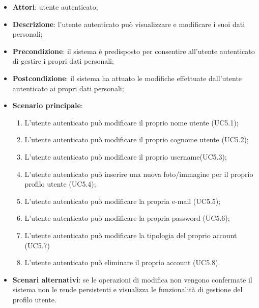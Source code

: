 \begin{itemize}
	\item \textbf{Attori}: utente autenticato;
	\item \textbf{Descrizione}: l'utente autenticato può visualizzare e modificare i suoi dati personali;
	\item \textbf{Precondizione}: il sistema è predisposto per consentire all'utente autenticato di gestire i propri dati personali;
	\item \textbf{Postcondizione}: il sistema ha attuato le modifiche effettuate dall'utente autenticato ai propri dati personali;
	\item \textbf{Scenario principale}:
		\begin{enumerate}
			\item L'utente autenticato può modificare il proprio nome utente (UC5.1);
			\item L'utente autenticato può modificare il proprio cognome utente (UC5.2);
			\item L'utente autenticato può modificare il proprio username(UC5.3);
			\item L'utente autenticato può inserire una nuova foto/immagine per il proprio profilo utente (UC5.4);
			\item L'utente autenticato può modificare la propria e-mail (UC5.5);
			\item L'utente autenticato può modificare la propria password (UC5.6);
			\item L'utente autenticato può modificare la tipologia del proprio account (UC5.7)
			\item L'utente autenticato può eliminare il proprio account (UC5.8).
		\end{enumerate} 
	\item \textbf{Scenari alternativi}: se le operazioni di modifica non vengono confermate il sistema non le rende persistenti e visualizza le funzionalità di gestione del profilo utente. 
\end{itemize}

